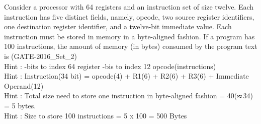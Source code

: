\begin{questyle}
  \question  Consider a processor with 64 registers and an instruction set of size twelve. Each
             instruction has five distinct fields, namely, opcode, two source register identifiers,
             one destination register identifier, and a twelve-bit immediate value. Each instruction
             must be stored in memory in a byte-aligned fashion. If a program has 100 instructions,
             the amount of memory (in bytes) consumed by the program text is \fillin[500] (GATE-2016\_Set\_2)
             \\ Hint : -bits to index 64 register -bis to index 12 opcode(instructions)
             \\ Hint : \quad Instruction(34 bit) = opcode(4) + R1(6) + R2(6) + R3(6) + Immediate Operand(12)
             \\ Hint : \quad Total size need to store one instruction in byte-aligned fashion = 40(\(\thickapprox\)34) = 5 bytes.
             \\ Hint : \quad Size to store 100 instructions = 5 x 100 = 500 Bytes
\end{questyle}

